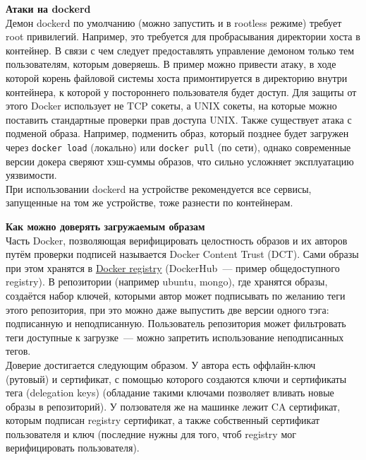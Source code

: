     \textbf{Атаки на dockerd} ~\\
    Демон dockerd по умолчанию (можно запустить и в rootless режиме) требует root привилегий. Например, это требуется для пробрасывания директории хоста в контейнер. В связи с чем следует предоставлять
    управление демоном только тем пользователям, которым доверяешь. В пример можно привести атаку, в ходе которой корень файловой системы хоста примонтируется в директорию внутри контейнера, к которой
    у постороннего пользователя будет доступ. Для защиты от этого Docker использует не TCP сокеты, а UNIX сокеты, на которые можно поставить стандартные проверки прав доступа UNIX.
    Также существует атака с подменой образа. Например, подменить образ, который позднее будет загружен через \texttt{docker load} (локально) или \texttt{docker pull} (по сети), однако современные версии докера
    сверяют хэш-суммы образов, что сильно усложняет эксплуатацию уязвимости. \autocite{DockerSecurity} ~\\
    При использовании dockerd на устройстве рекомендуется все сервисы, запущенные на том же устройстве, тоже разнести по контейнерам.

    \textbf{Как можно доверять загружаемым образам} ~\\
    Часть Docker, позволяющая верифицировать целостность образов и их авторов путём проверки подписей называется Docker Content Trust (DCT). Сами образы при этом хранятся в \href{https://docs.docker.com/registry/}{Docker registry} (DockerHub~--- пример общедоступного registry).
    В репозитории (например ubuntu, mongo), где хранятся образы, создаётся набор ключей, которыми автор может подписывать по желанию теги этого репозитория, при это можно даже выпустить две версии одного тэга:
    подписанную и неподписанную. Пользователь репозитория может фильтровать теги доступные к загрузке~--- можно запретить использование неподписанных тегов. ~\\
    Доверие достигается следующим образом. У автора есть оффлайн-ключ (рутовый) и сертификат, с помощью которого создаются ключи и сертификаты тега (delegation keys) (обладание такими ключами позволяет вливать новые образы в репозиторий). \autocite{DockerSecurityTrust} У ползователя же на машинке лежит
    CA сертификат, которым подписан registry сертификат, а также собственный сертификат пользователя и ключ (последние нужны для того, чтоб registry мог верифицировать пользователя). \autocite{DockerSecurityCertificates}

